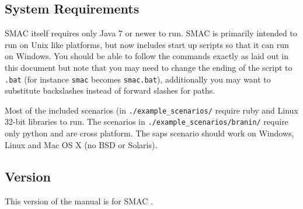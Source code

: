 \documentclass[manual.tex]{subfiles}
\begin{document}
\subsection{System Requirements}

SMAC itself requires only Java 7 or newer to run. SMAC is primarily intended to run on Unix like platforms, but now includes start up scripts so that it can run on Windows. You should be able to follow the commands exactly as laid out in this document but note that you may need to change the ending of the script to \texttt{.bat} (for instance \texttt{smac} becomes \texttt{smac.bat}), additionally you may want to substitute backslashes instead of forward slashes for paths.

Most of the included scenarios (in \texttt{./example\_scenarios/} require ruby and Linux 32-bit libraries to run. The scenarios in \texttt{./example\_scenarios/branin/} require only python and are cross platform. The saps scenario should work on Windows, Linux and Mac OS X (no BSD or Solaris).

\subsection{Version}
This version of the manual is for SMAC $\!\!$.
\\




\end{document}
